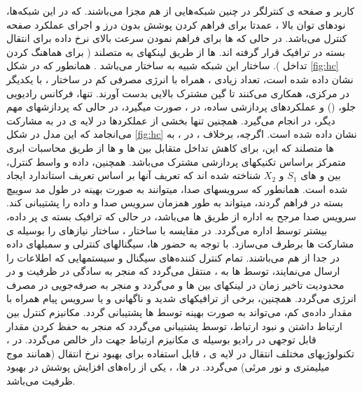 \begin{itemize}
کاربر و صفحه ی کنترلگر در چنین شبکه‌هایی از هم مجزا می‌باشند. که در این شبکه‌ها، نودهای توان بالا   ، عمدتا برای فراهم کردن پوشش بدون درز و اجرای عملکرد صفحه کنترل می‌باشد. در حالی که ها برای فراهم نمودن سرعت بالای نرخ داده برای انتقال بسته در ترافیک قرار گرفته اند. ها از طریق لینکهای   به  متصلند ( برای هماهنگ کردن تداخل ).\newline
ساختار این شبکه شبیه به ساختار  می‌باشد . همانطور که در شکل \eqref{fig:hc} نشان داده شده است، تعداد زیادی ، همراه با انرژی مصرفی کم در ساختار ، با یکدیگر در  مرکزی، همکاری می‌کنند تا گین مشترک بالایی بدست آورند. تنها‌، فرکانس رادیویی جلو، () و عملکردهای پردازشی  ساده، در ، صورت میگیرد، در حالی که پردازشهای مهم دیگر، در  انجام می‌گیرد. همچنین تنها بخشی از عملکردها در لایه ی  در  به مشارکت می‌انجامد که این مدل در شکل \eqref{fig:hc} نشان داده شده است.\newline
اگرچه، برخلاف ، در ، به ها متصلند که این، برای کاهش تداخل متقابل بین ها و ها از طریق محاسبات ابری متمرکز براساس تکنیکهای پردازشی مشترک می‌باشد. همچنین، داده و واسط کنترل، بین  و های $S_1$ و $X_2$ شناخته شده اند که تعریف آنها بر اساس تعریف استاندارد  ایجاد شده است.\newline
همانطور که سرویسهای صدا، میتوانند به صورت بهینه در طول مد سوییچ بسته در  فراهم گردند،  میتواند به طور همزمان سرویس صدا و داده را پشتیبانی کند. سرویس صدا مرجح به اداره از طریق ها می‌باشد، در حالی که ترافیک بسته ی پر داده، بیشتر توسط  اداره می‌گردد. 
در مقایسه با ساختار ، ساختار  نیازهای  را بوسیله ی مشارکت ها برطرف می‌سازد. با توجه به حضور ها، سیگنالهای کنترلی و سمبلهای داده در  جدا از هم می‌باشند. تمام کنترل کننده‌های سیگنال و سیستمهایی که اطلاعات را ارسال می‌نمایند، توسط ها به ، منتقل می‌گردد که منجر به سادگی در ظرفیت و در محدودیت تاخیر زمان در لینکهای  بین ها و   می‌گردد و منجر به صرفه‌جویی در مصرف انرژی می‌گردد. همچنین، برخی از ترافیکهای شدید و ناگهانی  و یا سرویس پیام همراه با مقدار داده‌ی کم، می‌تواند به صورت بهینه توسط ها پشتیبانی گردد. مکانیزم کنترل بین ارتباط داشتن و نبود ارتباط، توسط  پشتیبانی می‌گردد که منجر به حفظ کردن مقدار قابل توجهی  در رادیو بوسیله ی مکانیزم ارتباط جهت دار خالص می‌گردد. در ، تکنولوژیهای مختلف انتقال در لایه ی ، قابل استفاده برای بهبود نرخ انتقال (همانند موج میلیمتری و نور مرئی) می‌گردد. در ها، ، یکی از راه‌های افزایش پوشش در بهبود ظرفیت می‌باشد.


\end{itemize}

